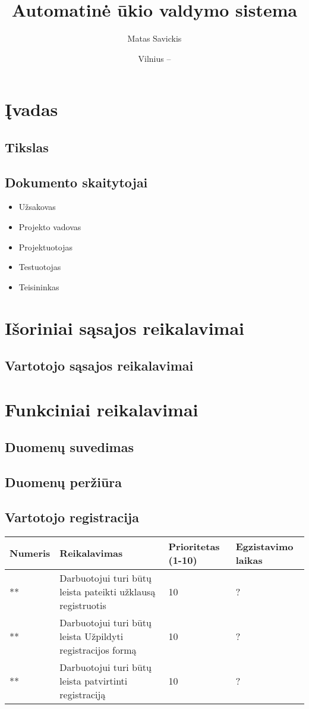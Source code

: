 \documentclass[oneside]{VUMIFPSkursinis}
\title{Automatinė ūkio valdymo sistema}
\author{Matas Savickis}
\date{Vilnius – \the\year}
\begin{document}
\maketitle

\tableofcontents
\centering

\section{Įvadas}
\subsection{Tikslas}
\subsection{Dokumento skaitytojai}
\begin{itemize}
	\item Užsakovas
	\item Projekto vadovas
	\item Projektuotojas
	\item Testuotojas
	\item Teisininkas
\end{itemize}

\section{Išoriniai sąsajos reikalavimai}
\subsection{Vartotojo sąsajos reikalavimai}

\section{Funkciniai reikalavimai}
\subsection{Duomenų suvedimas}
\subsection{Duomenų peržiūra}
\subsection{Vartotojo registracija}
%
\begin{tabularx}{\textwidth}{ |X|X|X|X| }
  \hline
  Numeris & Reikalavimas & Prioritetas \newline (1-10)  & Egzistavimo \newline laikas \\
  \hline 
 **  & Darbuotojui turi būtų leista pateikti užklausą registruotis  & 10  & ?  \\
  \hline
   **  & Darbuotojui turi būtų leista Užpildyti registracijos formą  & 10  & ?  \\
  \hline
     **  & Darbuotojui turi būtų leista patvirtinti registraciją  & 10  & ?  \\
  \hline
\end{tabularx}
\end{document}
